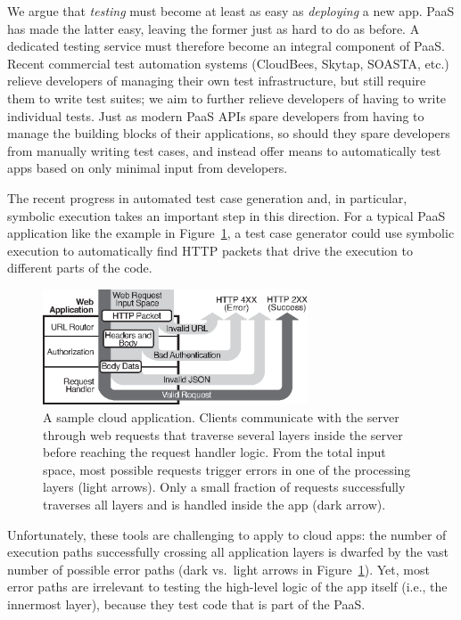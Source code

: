 We argue that {\em testing} must become at least as easy as {\em deploying} a new app. PaaS has made the latter easy, leaving the former just as hard to do as before.  A dedicated testing service must therefore become an integral component of PaaS.
%
Recent commercial test automation systems (CloudBees, Skytap, SOASTA, etc.) relieve developers of managing their own test infrastructure, but still require them to write test suites; we aim to further relieve developers of having to write individual tests.
%
Just as modern PaaS APIs spare developers from having to manage the building blocks of their applications, so should they spare developers from manually writing test cases, and instead offer means to automatically test apps based on only minimal input from developers.

The recent progress in automated test case generation and, in particular, symbolic execution takes an important step in this direction.  For a typical PaaS application like the example in Figure~\ref{fig:running-example}, a test case generator could use symbolic execution to automatically find HTTP packets that drive the execution to different parts of the code.
%
\begin{figure}
  \centering
  \includegraphics[width=0.7\textwidth]{paas/figures/web-flow}
  \caption{A sample cloud application.  Clients communicate with the server through web requests that traverse several layers inside the server before reaching the request handler logic.  From the total input space, most possible requests trigger errors in one of the processing layers (light arrows).  Only a small fraction of requests successfully traverses all layers and is handled inside the app (dark arrow).}
  \label{fig:running-example}
  \vspace{5pt}
\end{figure}
%
Unfortunately, these tools are challenging to apply to cloud apps: the number of execution paths successfully crossing all application layers is dwarfed by the vast number of possible error paths (dark vs.~light arrows in Figure~\ref{fig:running-example}).  Yet, most error paths are irrelevant to testing the high-level logic of the app itself (i.e., the innermost layer), because they test code that is part of the PaaS.

